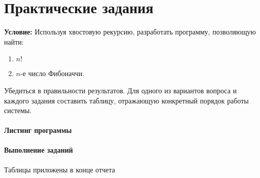 \chapter{Практические задания}

\textbf{Условие:} Используя хвостовую рекурсию, разработать программу, позволяющую найти:

\begin{enumerate}
	\item $n!$
	\item $n$-е число Фибоначчи.
\end{enumerate}

Убедиться в правильности результатов. Для  одного из вариантов вопроса и  каждого задания составить  таблицу, отражающую конкретный порядок работы системы.

\subsubsection{Листинг программы}



\subsubsection{Выполнение заданий}

Таблицы приложены в конце отчета
